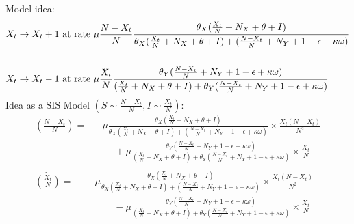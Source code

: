 \documentclass[10pt,a4paper]{article}
\begin{document}
Model idea:
\begin{align*}
\begin{split}
X_t \rightarrow X_t + 1 & \textnormal{ at rate } \mu\frac{N-X_t}{N}\frac{\theta_X (\frac{X_t}{N} + N_X + \theta + I)}{\theta_X (\frac{X_t}{N} + N_X + \theta + I) + (\frac{N-X_t}{N} + N_Y + 1-\epsilon + \kappa\omega)} \\
&\\
X_t \rightarrow X_t - 1 & \textnormal{ at rate } \mu\frac{X_t}{N}\frac{\theta_Y(\frac{N-X_t}{N}+N_Y+1-\epsilon+\kappa\omega)}{(\frac{X_t}{N} + N_X+\theta+I) + \theta_Y(\frac{N-X_t}{N}+N_Y+1-\epsilon+\kappa\omega)}
\end{split}
\end{align*}
Idea as a SIS Model $\left(S \sim \frac{N-X_t}{N}, I \sim \frac{X_t}{N}\right)$:
\begin{align*}
	\dot{\left(\frac{N-X_t}{N}\right)} = &- \mu\frac{\theta_X (\frac{X_t}{N} + N_X + \theta + I)}{\theta_X (\frac{X_t}{N} + N_X + \theta + I) + (\frac{N-X_t}{N} + N_Y + 1-\epsilon + \kappa\omega)} \times \frac{X_t(N-X_t)}{N^2} \\
	&\qquad + \mu\frac{\theta_Y(\frac{N-X_t}{N}+N_Y+1-\epsilon+\kappa\omega)}{(\frac{X_t}{N} + N_X+\theta+I) + \theta_Y(\frac{N-X_t}{N}+N_Y+1-\epsilon+\kappa\omega)} \times \frac{X_t}{N}\\
	&\\
	\dot{\left(\frac{X_t}{N}\right)} = & \mu\frac{\theta_X (\frac{X_t}{N} + N_X + \theta + I)}{\theta_X (\frac{X_t}{N} + N_X + \theta + I) + (\frac{N-X_t}{N} + N_Y + 1-\epsilon + \kappa\omega)} \times \frac{X_t(N-X_t)}{N^2} \\
	&\qquad - \mu\frac{\theta_Y(\frac{N-X_t}{N}+N_Y+1-\epsilon+\kappa\omega)}{(\frac{X_t}{N} + N_X+\theta+I) + \theta_Y(\frac{N-X_t}{N}+N_Y+1-\epsilon+\kappa\omega)} \times \frac{X_t}{N}
\end{align*}

\end{document}
